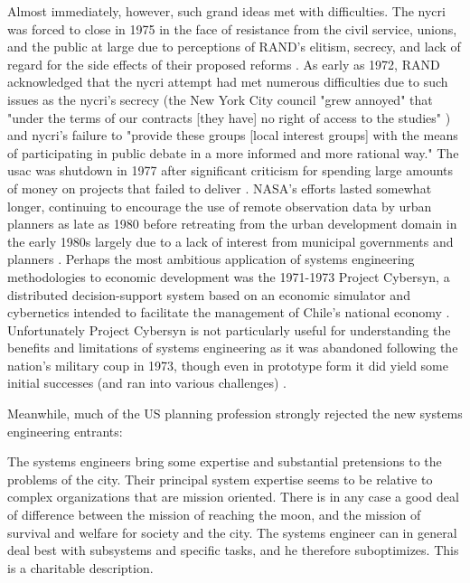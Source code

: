 Almost immediately, however, such grand ideas met with difficulties. The \ac{nycri} was forced to close in 1975 in the face of resistance from the civil service, unions, and the public at large due to perceptions of RAND's elitism, secrecy, and lack of regard for the side effects of their proposed reforms \cite{lightWarfareWelfareDefense2005}. As early as 1972, RAND acknowledged that the \ac{nycri} attempt had met numerous difficulties due to such issues as the \ac{nycri}'s secrecy (the New York City council "grew annoyed" that "under the terms of our contracts [they have] no right of access to the studies" \cite{szantonAnalysisUrbanGovernment1972}) and \ac{nycri}'s failure to "provide these groups [local interest groups] with the means of participating in public debate in a more informed and more rational way." \cite{szantonAnalysisUrbanGovernment1972} The \ac{usac} was shutdown in 1977 after significant criticism for spending large amounts of money on projects that failed to deliver \cite{kraemerRequiemUSAC1979}. NASA's efforts lasted somewhat longer, continuing to encourage the use of remote observation data by urban planners as late as 1980 \cite{rushRemoteSensingUtility1976, haggertySpinoff19801980} before retreating from the urban development domain in the early 1980s largely due to a lack of interest from municipal governments and planners \cite{lightWarfareWelfareDefense2005}. Perhaps the most ambitious application of systems engineering methodologies to economic development was the 1971-1973 Project Cybersyn, a distributed decision-support system based on an economic simulator and cybernetics intended to facilitate the management of Chile's national economy \cite{medinaCyberneticRevolutionariesTechnology2011}. Unfortunately Project Cybersyn is not particularly useful for understanding the benefits and limitations of systems engineering as it was abandoned following the nation's military coup in 1973, though even in prototype form it did yield some initial successes (and ran into various challenges) \cite{medinaDesigningFreedomRegulating2006}. 

Meanwhile, much of the US planning profession strongly rejected the new systems engineering entrants:

\begin{singlespcquote}
The systems engineers bring some expertise and substantial pretensions to the problems of the city. Their principal system expertise seems to be relative to complex organizations that are mission oriented. There is in any case a good deal of difference between the mission of reaching the moon, and the mission of survival and welfare for society and the city. The systems engineer can in general deal best with subsystems and specific tasks, and he therefore suboptimizes. This is a charitable description. \cite{robinsonDecisionmakingUrbanPlanning1972}
\end{singlespcquote}

